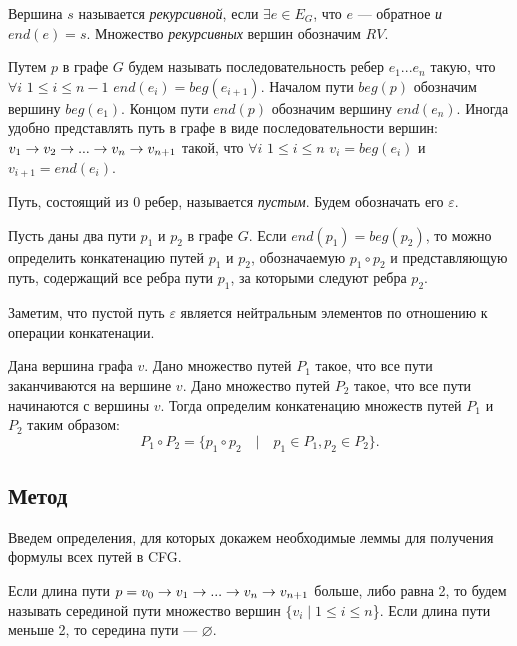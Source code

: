 \begin{defn}\label{recursiveVertex}
Вершина $s$ называется \emph{рекурсивной}, если $\exists e \in E_G$, что $e$ --- обратное \emph{и} $end(e) = s$. 
Множество \emph{рекурсивных} вершин обозначим $RV$.
\end{defn}

\begin{defn}
Путем $p$ в графе $G$ будем называть последовательность ребер $e_1...e_n$ такую,
что $\forall i$ $ 1 \leq i \leq n - 1$ $end(e_i) = beg(e_{i+1})$.
Началом пути $beg(p)$ обозначим вершину $beg(e_1)$.
Концом пути $end(p)$ обозначим вершину $end(e_n)$.
Иногда удобно представлять путь в графе в виде последовательности вершин:
$v_1 \rightarrow v_2 \rightarrow ... \rightarrow v_n \rightarrow v_{n + 1}$ такой, что $\forall i$ $1 \leq i \leq n$ $v_i = beg(e_i)$ и $v_{i+1} = end(e_i)$.
\end{defn}

\begin{defn}
Путь, состоящий из 0 ребер, называется \emph{пустым}.
Будем обозначать его $\varepsilon$.
\end{defn}

\begin{defn}
Пусть даны два пути $p_1$ и $p_2$ в графе $G$.
Если $end(p_1) = beg(p_2)$, то можно определить конкатенацию путей $p_1$ и $p_2$, обозначаемую $p_1 \circ p_2$ и представляющую путь, содержащий все ребра пути $p_1$, за которыми следуют ребра $p_2$.

Заметим, что пустой путь $\varepsilon$ является нейтральным элементов по отношению к операции конкатенации.
\end{defn}

\begin{defn}
Дана вершина графа $v$.
Дано множество путей $P_1$ такое, что все пути заканчиваются на вершине $v$.
Дано множество путей $P_2$ такое, что все пути начинаются с вершины $v$.
Тогда определим конкатенацию множеств путей $P_1$ и $P_2$ таким образом:
$$P_1 \circ P_2 = \{p_1 \circ p_2 \quad | \quad p_1 \in P_1, p_2 \in P_2 \}.$$
\end{defn}

\subsection{Метод}
Введем определения, для которых докажем необходимые леммы для получения формулы всех путей в CFG.


\begin{defn}
Если длина пути $p = v_0 \rightarrow v_1 \rightarrow ... \rightarrow v_n \rightarrow v_{n+1}$ больше, либо равна 2, то будем называть серединой пути множество вершин 
$\{v_i \mid 1 \leq i \leq n$\}. Если длина пути меньше 2, то середина пути --- $\varnothing$.
\end{defn}

